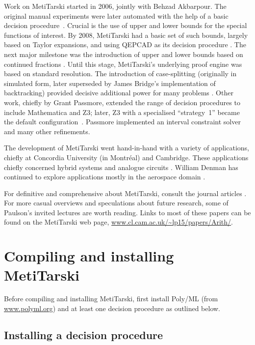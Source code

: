 \documentclass[a4paper,11pt]{scrartcl}
\begin{document}
Work on MetiTarski started in 2006, jointly with Behzad Akbarpour. The original manual experiments \cite{akbarpour-towards}
were later automated with the help of a basic decision procedure~\cite{akbarpour-extending}.
Crucial is the use of upper and lower bounds for the special functions of interest.
By 2008, MetiTarski had a basic set of such bounds, largely based on Taylor expansions, and using QEPCAD as its decision procedure \cite{akbarpour2008}.
The next major milestone was the introduction of upper and lower bounds based on continued fractions \cite{metitarski-jar}.
Until this stage, MetiTarski's underlying proof engine was based on standard resolution. The introduction of case-splitting (originally in simulated form, later superseded by James Bridge's implementation of backtracking) provided decisive additional power for many problems \cite{bridge-case}.
Other work, chiefly by Grant Passmore, extended the range of decision procedures to include Mathematica and Z3; later, Z3 with a specialised ``strategy~1'' became the default configuration~\cite{passmore-real}.
Passmore implemented an interval constraint solver and many other refinements.

The development of MetiTarski went hand-in-hand with a variety of applications, chiefly at Concordia University (in Montréal) and Cambridge.
These applications chiefly concerned hybrid systems \cite{akbarpour-hscc} and analogue circuits \cite{denman-analog,narayanan-formal}.
William Denman has continued to explore applications mostly in the aerospace domain
\cite{denman-quantum,denman-pvs,denman-flight}.

For definitive and comprehensive about MetiTarski, consult the journal articles \cite{bridge-case,metitarski-jar}.
For more casual overviews and speculations about future research, some of Paulson's invited lectures \cite{paulson-past,paulson-phase} are worth reading.
Links to most of these papers can be found on the MetiTarski web page, \url{www.cl.cam.ac.uk/~lp15/papers/Arith/}.

\section{Compiling and installing MetiTarski}

Before compiling and installing MetiTarski, first install Poly/ML (from \url{www.polyml.org})
and at least one decision procedure as outlined below.


\subsection{Installing a decision procedure}
\end{document}
